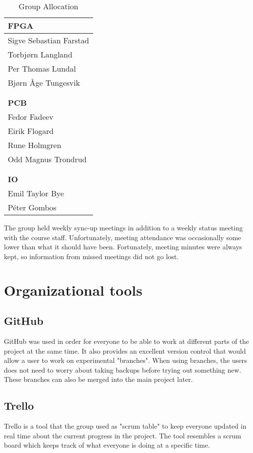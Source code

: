 \begin{table}[H]
\begin{center}
\begin{tabular}{l}
\textbf{FPGA} \\
\hline
Sigve Sebastian Farstad \\
Torbjørn Langland \\
Per Thomas Lundal \\
Bjørn Åge Tungesvik \\
\\
\\
\textbf{PCB} \\
\hline
Fedor Fadeev \\
Eirik Flogard \\
Rune Holmgren \\
Odd Magnus Trondrud \\
\\
\\
\textbf{IO} \\
\hline
Emil Taylor Bye \\
Péter Gombos \\
\end{tabular}
\caption{Group Allocation}
\label{table:group-allocation}
\end{center}
\end{table}

The group held weekly sync-up meetings in addition to a weekly status meeting with the course staff.
Unfortunately, meeting attendance was occasionally some lower than what it should have been.
Fortunately, meeting minutes were always kept, so information from missed meetings did not go lost.

\section{Organizational tools}
\subsection{GitHub}
GitHub was used in order for everyone to be able to work at different parts of the project at the same time.
It also provides an excellent version control that would allow a user to work on experimental "branches". When using 
branches, the users does not need to worry about taking backups before trying out something new. These branches can also be merged into the main project later.
\subsection{Trello}
Trello is a tool that the group used as "scrum table" to keep everyone updated in real time about the current progress in the project.
The tool resembles a scrum board which keeps track of what everyone is doing at a specific time.

